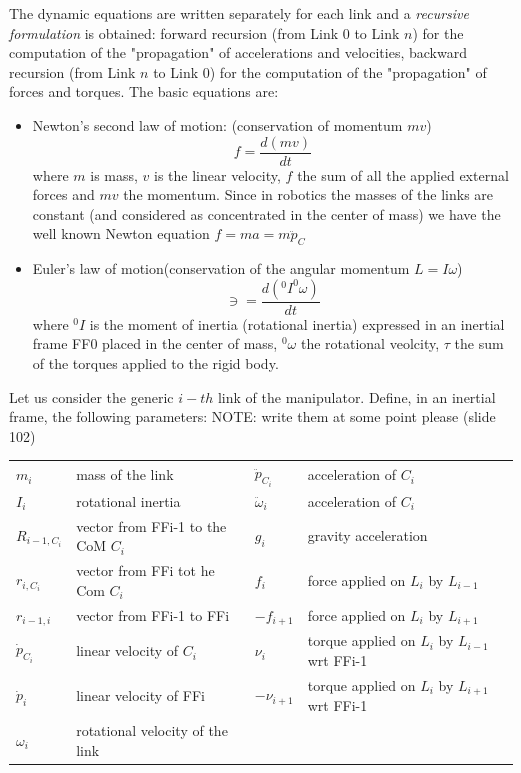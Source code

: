 \documentclass{book}
\begin{document}
The dynamic equations are written separately for each link and a \emph{recursive formulation} is obtained: forward recursion (from Link 0 to Link $n$) for the computation of the "propagation" of accelerations and velocities, backward recursion (from Link $n$ to Link 0) for the computation of the "propagation" of forces and torques. The basic equations are:
\begin{itemize}
    \item Newton's second law of motion: (conservation of momentum $mv$)
        \[
            f= \frac{d(mv)}{dt}
        \]
        where $m$ is mass, $v$ is the linear velocity, $f$ the sum of all the applied external forces and $mv$ the momentum. Since in robotics the masses of the links are constant (and considered as concentrated in the center of mass) we have the well known Newton equation $f=ma=m\ddot{p}_C$
    \item Euler's law of motion(conservation of the angular momentum $L=I\omega$)
        \[
            \ni = \frac{d(^0I^0\omega)}{dt}
        \]
        where $^0I$ is the moment of inertia (rotational inertia) expressed in an inertial frame FF0 placed in the center of mass, $^0\omega$ the rotational veolcity, $\tau$ the sum of the torques applied to the rigid body.
\end{itemize}
Let us consider the generic $i-th$ link of the manipulator. Define, in an inertial frame, the following parameters: NOTE: write them at some point please (slide 102)
\begin{tabular}{ l l | l l }
    $m_i$ & mass of the link & $\ddot{p}_{C_i}$ & acceleration of $C_i$\\
    $I_i$ & rotational inertia & $\ddot{\omega}_i$ & acceleration of $C_i$\\
    $R_{i-1,C_i}$ & vector from FFi-1 to the CoM $C_i$ & $g_i$ & gravity acceleration \\
    $r_{i,C_i}$ & vector from FFi tot he Com $C_i$ & $f_i$ & force applied on $L_i$ by $L_{i-1} $\\
    $r_{i-1,i}$ & vector from FFi-1 to FFi & $-f_{i+1}$ & force applied on $L_i$ by $L_{i+1}$ \\
    $\dot{p}_{C_i}$ & linear velocity of $C_i$ & $\nu_i$ & torque applied on $L_i$ by $L_{i-1}$ wrt FFi-1 \\
    $\dot{p}_i$ & linear velocity of FFi & $-\nu_{i+1}$ &torque applied on $L_i$ by $L_{i+1}$ wrt FFi-1\\
    $\omega_i$ & rotational velocity of the link &  & 
\end{tabular}
\end{document}
